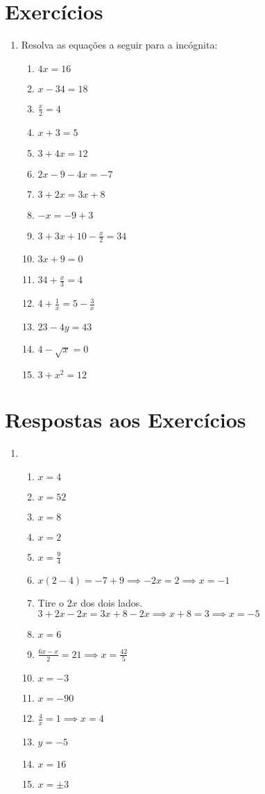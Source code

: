 \documentclass[11pt]{article}
\begin{document}
\newpage

\section{Exercícios}
\begin{enumerate}
	\item Resolva as equações a seguir para a incógnita:
	\begin{enumerate}
		\item $4x = 16$
		\item $x - 34 = 18$
		\item $\frac{x}{2} = 4$
		\item $x + 3 = 5$
		\item $3 + 4x = 12$
		\item $2x -9 -4x = -7$
		\item $3 + 2x = 3x + 8$
		\item $-x = -9+3$
		\item $3 + 3x + 10 -\frac{x}{2} = 34$
		\item $3x + 9 = 0$
		\item $34 + \frac{x}{3} = 4$
		\item $4 + \frac{1}{x} = 5 - \frac{3}{x}$
		\item $23 - 4y = 43$
		\item $4 - \sqrt{x} = 0$
		\item $3 + x^2 = 12$
	\end{enumerate}
\end{enumerate}

\newpage

\section{Respostas aos Exercícios}
\begin{enumerate}
	\item
	\begin{enumerate}
		\item $x = 4$
		\item $x = 52$
		\item $x = 8$
		\item $x = 2$
		\item $x = \frac{9}{4}$
		\item $x(2 - 4) = -7 + 9 \implies -2x = 2 \implies x = -1$
		\item Tire o $2x$ dos dois lados. $3 + 2x - 2x = 3x + 8 -2x \implies
			  x + 8 = 3 \implies x = -5$
		\item $x = 6$
		\item $\frac{6x - x}{2} = 21 \implies x = \frac{42}{5}$
		\item $x = -3$
		\item $x = -90$
		\item $\frac{4}{x} = 1 \implies x = 4$
		\item $y = -5$
		\item $x = 16$
		\item $x = \pm 3$
	\end{enumerate}
\end{enumerate}
\end{document}
